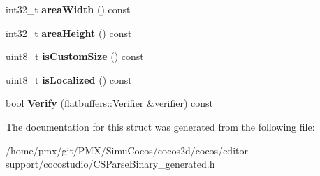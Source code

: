 \begin{DoxyCompactItemize}
int32\+\_\+t {\bfseries area\+Width} () const
\item 
\mbox{\label{structflatbuffers_1_1TextFieldOptions_a5b9af0ac0dabcb6535256aa441d52b3f}} 
int32\+\_\+t {\bfseries area\+Height} () const
\item 
\mbox{\label{structflatbuffers_1_1TextFieldOptions_a95bfbbd5568af05f5cbc54ef9d57925b}} 
uint8\+\_\+t {\bfseries is\+Custom\+Size} () const
\item 
\mbox{\label{structflatbuffers_1_1TextFieldOptions_a4252ad7d172ef14155373bffb1eec4c8}} 
uint8\+\_\+t {\bfseries is\+Localized} () const
\item 
\mbox{\label{structflatbuffers_1_1TextFieldOptions_aaf572bb554a779cae94ff47cd957ee5b}} 
bool {\bfseries Verify} (\hyperlink{classflatbuffers_1_1Verifier}{flatbuffers\+::\+Verifier} \&verifier) const
\end{DoxyCompactItemize}


The documentation for this struct was generated from the following file\+:\begin{DoxyCompactItemize}
\item 
/home/pmx/git/\+P\+M\+X/\+Simu\+Cocos/cocos2d/cocos/editor-\/support/cocostudio/C\+S\+Parse\+Binary\+\_\+generated.\+h\end{DoxyCompactItemize}
